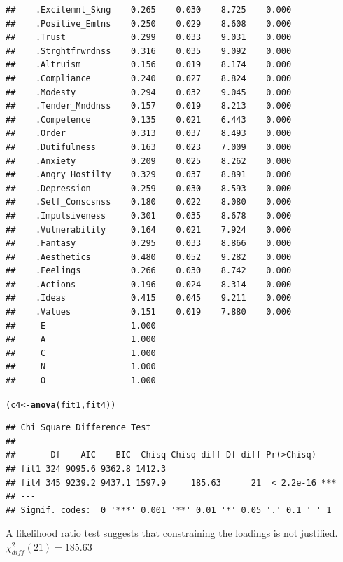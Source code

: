 \documentclass{article}\usepackage[]{graphicx}\usepackage[]{color}
\makeatletter
\newcommand{\hlstd}[1]{\textcolor[rgb]{0.345,0.345,0.345}{#1}}%
\newcommand{\hlkwb}[1]{\textcolor[rgb]{0.69,0.353,0.396}{#1}}%
\newcommand{\hlkwd}[1]{\textcolor[rgb]{0.737,0.353,0.396}{\textbf{#1}}}%
\newenvironment{kframe}{%
 \def\at@end@of@kframe{}%
 \ifinner\ifhmode%
  \def\at@end@of@kframe{\end{minipage}}%
  \begin{minipage}{\columnwidth}%
 \fi\fi%
 \def\FrameCommand##1{\hskip\@totalleftmargin \hskip-\fboxsep
 \colorbox{shadecolor}{##1}\hskip-\fboxsep
     \hskip-\linewidth \hskip-\@totalleftmargin \hskip\columnwidth}%
 \MakeFramed {\advance\hsize-\width
   \@totalleftmargin\z@ \linewidth\hsize
   \@setminipage}}%
 {\par\unskip\endMakeFramed%
 \at@end@of@kframe}
\newenvironment{knitrout}{}{} %
\makeatother
\begin{document}
\begin{knitrout}
\begin{kframe}
\begin{verbatim}
##    .Excitemnt_Skng    0.265    0.030    8.725    0.000
##    .Positive_Emtns    0.250    0.029    8.608    0.000
##    .Trust             0.299    0.033    9.031    0.000
##    .Strghtfrwrdnss    0.316    0.035    9.092    0.000
##    .Altruism          0.156    0.019    8.174    0.000
##    .Compliance        0.240    0.027    8.824    0.000
##    .Modesty           0.294    0.032    9.045    0.000
##    .Tender_Mnddnss    0.157    0.019    8.213    0.000
##    .Competence        0.135    0.021    6.443    0.000
##    .Order             0.313    0.037    8.493    0.000
##    .Dutifulness       0.163    0.023    7.009    0.000
##    .Anxiety           0.209    0.025    8.262    0.000
##    .Angry_Hostilty    0.329    0.037    8.891    0.000
##    .Depression        0.259    0.030    8.593    0.000
##    .Self_Conscsnss    0.180    0.022    8.080    0.000
##    .Impulsiveness     0.301    0.035    8.678    0.000
##    .Vulnerability     0.164    0.021    7.924    0.000
##    .Fantasy           0.295    0.033    8.866    0.000
##    .Aesthetics        0.480    0.052    9.282    0.000
##    .Feelings          0.266    0.030    8.742    0.000
##    .Actions           0.196    0.024    8.314    0.000
##    .Ideas             0.415    0.045    9.211    0.000
##    .Values            0.151    0.019    7.880    0.000
##     E                 1.000                           
##     A                 1.000                           
##     C                 1.000                           
##     N                 1.000                           
##     O                 1.000
\end{verbatim}
\begin{alltt}
\hlstd{(c4} \hlkwb{<-} \hlkwd{anova}\hlstd{(fit1, fit4))}
\end{alltt}
\begin{verbatim}
## Chi Square Difference Test
## 
##       Df    AIC    BIC  Chisq Chisq diff Df diff Pr(>Chisq)    
## fit1 324 9095.6 9362.8 1412.3                                  
## fit4 345 9239.2 9437.1 1597.9     185.63      21  < 2.2e-16 ***
## ---
## Signif. codes:  0 '***' 0.001 '**' 0.01 '*' 0.05 '.' 0.1 ' ' 1
\end{verbatim}
\end{kframe}
\end{knitrout}

A likelihood ratio test suggests that constraining the loadings is not justified. $\chi^2_{diff}(21) = 185.63$
\end{document}
